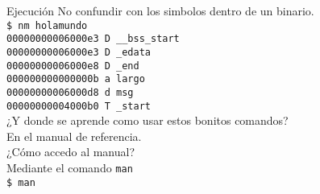 \documentclass[aspectratio=169]{beamer}
\begin{document}
\begin{frame}[fragile,t]{Ejecución}
    \small
    \textcolor{verdeuca}{No confundir con los simbolos dentro de un binario.}\\
    \pause
    \vspace{0.2cm}
    \verb|$ nm holamundo|\\
    \vspace{0.2cm}
    \pause
    \verb|00000000006000e3 D __bss_start|\\
    \verb|00000000006000e3 D _edata|\\
    \verb|00000000006000e8 D _end|\\
    \verb|000000000000000b a largo|\\
    \verb|00000000006000d8 d msg|\\
    \verb|00000000004000b0 T _start|\\
    \pause
    \vspace{0.4cm}
    \textcolor{verdeuca}{¿Y donde se aprende como usar estos bonitos comandos?}\\
    \pause
    \vspace{0.2cm}
    En el manual de referencia.\\
    \pause
    \vspace{0.4cm}
    \textcolor{verdeuca}{¿Cómo accedo al manual?}\\
    \pause
    \vspace{0.2cm}
    Mediante el comando \texttt{man}\\
    \vspace{0.2cm}
    \verb|$ man | \fbox{\textcolor{verdeuca}{comando}}
\end{frame}
\end{document}
